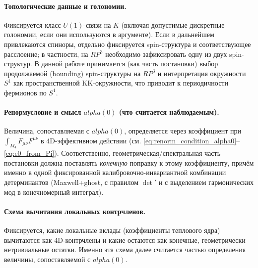 \documentclass[12pt]{article}
\def\mathbb#1{#1}%
\def\alpha{alpha}%
\begin{document}
\paragraph{Топологические данные и голономии.}
Фиксируется класс $U(1)$-связи на $K$ (включая допустимые дискретные голономии, если они используются в аргументе).
Если в дальнейшем привлекаются спиноры, отдельно фиксируется spin-структура и соответствующее расслоение; в частности, на $\mathbb{RP}^3$ необходимо зафиксировать одну из двух spin-структур.
В данной работе принимается (как часть постановки) выбор продолжаемой (bounding) spin-структуры на $\mathbb{RP}^3$ и интерпретация окружности $S^1$ как пространственной KK-окружности, что приводит к периодичности фермионов по $S^1$.

\paragraph{Ренормусловие и смысл $\alpha(0)$ (что считается наблюдаемым).}
Величина, сопоставляемая с $\alpha(0)$, определяется через коэффициент при $\int_{M_4}F_{\mu\nu}F^{\mu\nu}$ в 4D-эффективном действии (см. \eqref{eq:renorm_condition_alpha0}--\eqref{eq:e0_from_Pi}).
Соответственно, геометрическая/спектральная часть постановки должна поставлять \emph{конечную} поправку к этому коэффициенту, причём именно в одной фиксированной калибровочно-инвариантной комбинации детерминантов (Maxwell+ghost, с правилом $\det'$ и с выделением гармонических мод в конечномерный интеграл).

\paragraph{Схема вычитания локальных контрчленов.}
Фиксируется, какие локальные вклады (коэффициенты теплового ядра) вычитаются как 4D-контрчлены и какие остаются как конечные, геометрически нетривиальные остатки.
Именно эта схема далее считается частью определения величины, сопоставляемой с $\alpha(0)$.
\end{document}
